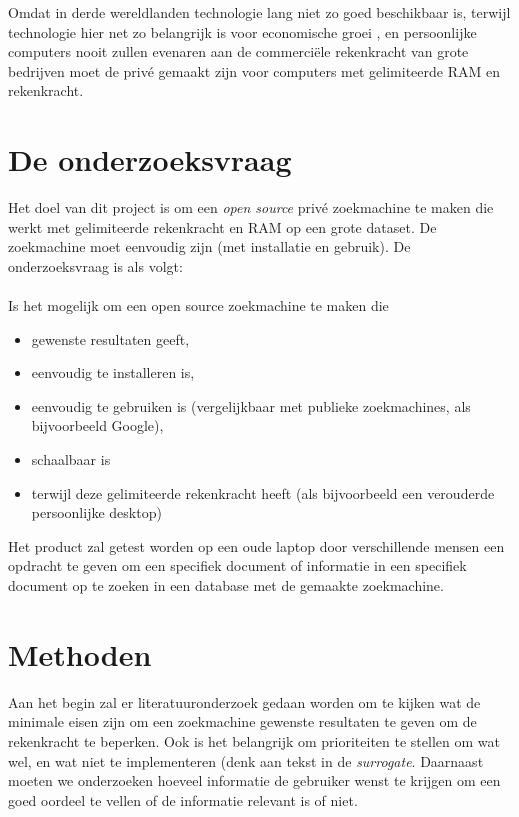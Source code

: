 \documentclass{uva-inf-article}
\begin{document}
Omdat in derde wereldlanden technologie lang niet zo goed beschikbaar is, terwijl technologie hier net zo belangrijk is voor economische groei \parencite{Shahidullah2019}, en persoonlijke computers nooit zullen evenaren aan de commerciële rekenkracht van grote bedrijven moet de privé gemaakt zijn voor computers met gelimiteerde RAM en rekenkracht. 

\section{De onderzoeksvraag}
Het doel van dit project is om een \textit{open source} privé zoekmachine te maken die werkt met gelimiteerde rekenkracht en RAM op een grote dataset. De zoekmachine moet eenvoudig zijn (met installatie en gebruik). De onderzoeksvraag is als volgt: \paragraph{}

Is het mogelijk om een open source zoekmachine te maken die
\begin{itemize}
    \item gewenste resultaten geeft,
    \item eenvoudig te installeren is,
    \item eenvoudig te gebruiken is (vergelijkbaar met publieke zoekmachines, als bijvoorbeeld Google),
    \item schaalbaar is
    \item terwijl deze gelimiteerde rekenkracht heeft (als bijvoorbeeld een verouderde persoonlijke desktop)
\end{itemize}

Het product zal getest worden op een oude laptop door verschillende mensen een opdracht te geven om een specifiek document of informatie in een specifiek document op te zoeken in een database met de gemaakte zoekmachine. 

\section{Methoden}
Aan het begin zal er literatuuronderzoek gedaan worden om te kijken wat de minimale eisen zijn om een zoekmachine gewenste resultaten te geven om de rekenkracht te beperken. Ook is het belangrijk om prioriteiten te stellen om wat wel, en wat niet te implementeren (denk aan tekst  in de \textit{surrogate}. Daarnaast moeten we onderzoeken hoeveel informatie de gebruiker wenst te krijgen om een goed oordeel te vellen of de informatie relevant is of niet. 
\end{document}
